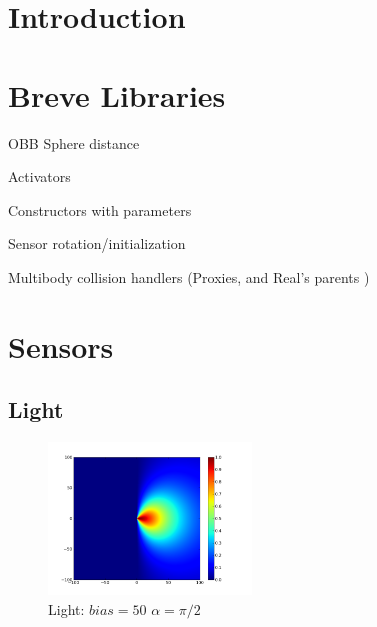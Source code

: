 \documentclass[a4paper]{article}
\title{\documentTitle}
\author{\documentAuthors{}}
\begin{document}
\maketitle
\cleardoublepage

\tableofcontents
\cleardoublepage


\setlength{\parindent}{1cm}
\setlength{\parskip}{0.3cm}

\section{Introduction}

\cleardoublepage
\section{Breve Libraries}
OBB Sphere distance

Activators

Constructors with parameters

Sensor rotation/initialization

Multibody collision handlers (Proxies, and Real's parents )

\cleardoublepage
\section{Sensors}

\subsection{Light}

\begin{figure}
	\vspace{-30pt}
	\begin{center}
		\includegraphics[width=0.48\textwidth]{graphs/light.png}
	\end{center}
	\vspace{-30pt}
	\caption{Light: $bias=50$ $\alpha=\pi/2$}
\end{figure}
\end{document}
